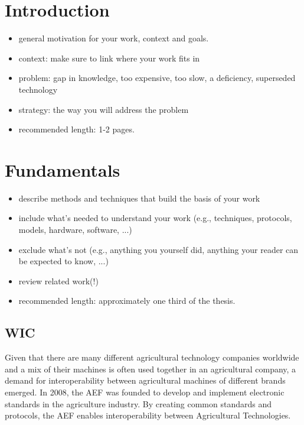 \documentclass[]{nsm-thesis}
\begin{document}
\cleardoublepage
{}


\chapter{Introduction}
\label{sec:introduction}

\begin{itemize}
\item general motivation for your work, context and goals.
\item context: make sure to link where your work fits in
\item problem: gap in knowledge, too expensive, too slow, a deficiency, superseded technology
\item strategy: the way you will address the problem
\item recommended length: 1-2 pages.
\end{itemize}




\chapter{Fundamentals}
\label{sec:fundamentals}



\begin{itemize}
\item describe methods and techniques that build the basis of your work
\item include what's needed to understand your work (e.g., techniques, protocols, models, hardware, software, ...)
\item exclude what's not (e.g., anything you yourself did, anything your reader can be expected to know, ...)
\item review related work(!)
\item recommended length: approximately one third of the thesis.
\end{itemize}

\section{\acl{WIC}}
Given that there are many different agricultural technology companies worldwide and a mix of their machines is often used together in an agricultural company, a demand for interoperability between agricultural machines of different brands emerged. In 2008, the \ac{AEF} was founded to develop and implement electronic standards in the agriculture industry. By creating common standards and protocols, the \ac{AEF} enables interoperability between Agricultural Technologies.
\end{document}
